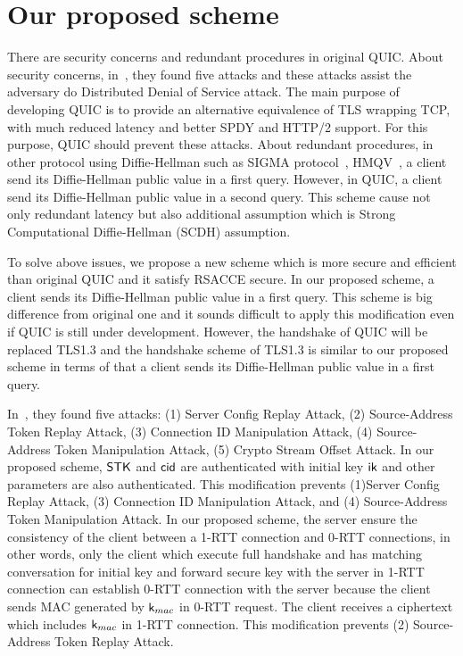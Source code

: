 \section{Our proposed scheme} \label{sec:proposed_scheme}

There are security concerns and redundant procedures in original
QUIC.
About security concerns, in~\cite{LJBN15:QUIC}, they found five
attacks and these attacks assist the adversary do Distributed
Denial of Service attack.
The main purpose of developing QUIC is to provide an
alternative equivalence of TLS wrapping TCP, with much
reduced latency and better SPDY and HTTP/2 support.
For this purpose, QUIC should prevent these attacks.
About redundant procedures, in other protocol using Diffie-Hellman
such as SIGMA protocol~\cite{Kra03:SIGMA}, HMQV~\cite{Kra05:HQMV},
a client send its Diffie-Hellman public value in a first query. However,
in QUIC, a client send its Diffie-Hellman public value in a second query.
This scheme cause not only redundant latency but also additional assumption
 which is Strong Computational Diffie-Hellman (SCDH) assumption.

To solve above issues, we propose a new scheme which is more secure and efficient
than original QUIC and it satisfy RSACCE secure.
In our proposed scheme, a client sends its Diffie-Hellman public value in
a first query.
This scheme is big difference from original one and it sounds difficult to apply
this modification even if QUIC is still under development.
However, the handshake of QUIC will be replaced TLS1.3 and the handshake scheme of
TLS1.3 is similar to our proposed scheme in terms of that a client sends its
Diffie-Hellman public value in a first query.

In~\cite{LJBN15:QUIC}, they found five attacks:
(1) Server Config Replay Attack,
(2) Source-Address Token Replay Attack,
(3) Connection ID Manipulation Attack,
(4) Source-Address Token Manipulation Attack,
(5) Crypto Stream Offset Attack.
In our proposed scheme, $\mathsf{STK}$ and $\mathsf{cid}$ are authenticated with initial key
$\mathsf{ik}$ and other parameters are also authenticated.
This modification prevents (1)Server Config Replay Attack,
(3) Connection ID Manipulation Attack, and
(4) Source-Address Token Manipulation Attack.
In our proposed scheme, the server ensure the consistency of the client between
a 1-RTT connection and 0-RTT connections, in other words, only the client which
execute full handshake and has matching conversation for initial key and forward
secure key with the server in 1-RTT connection can establish 0-RTT connection with
the server because the client sends MAC generated by $\mathsf{k}_{mac}$ in 0-RTT request.
The client receives a ciphertext which includes $\mathsf{k}_{mac}$ in 1-RTT connection.
This modification prevents (2) Source-Address Token Replay Attack.

